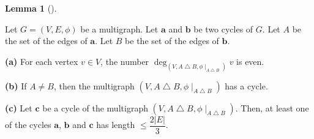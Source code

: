 \documentclass[numbers=enddot,12pt,final,onecolumn,notitlepage]{scrartcl}%
\theoremstyle{definition}
\newtheorem{lem}[theo]{Lemma}
\newenvironment{lemma}[1][]
{\begin{lem}[#1]\begin{leftbar}}
{\end{leftbar}\end{lem}}
\newcommand{\abs}[1]{\left| #1 \right|}
\newcommand{\tup}[1]{\left( #1 \right)}
\begin{document}
\begin{lemma} \label{lem.mt1.cyctree.two-cycles}
Let $G = \tup{V, E, \phi}$ be a multigraph. Let $\mathbf{a}$ and
$\mathbf{b}$ be two cycles of $G$. Let $A$ be the set of the edges
of $\mathbf{a}$. Let $B$ be the set of the edges of $\mathbf{b}$.

\textbf{(a)} For each vertex $v \in V$, the number
$\deg_{\tup{V, A \bigtriangleup B, \phi\mid_{A \bigtriangleup B}}} v$
is even.

\textbf{(b)} If $A \neq B$, then the multigraph
$\tup{V, A \bigtriangleup B, \phi\mid_{A \bigtriangleup B}}$ has a
cycle.

\textbf{(c)} Let $\mathbf{c}$ be a cycle of the multigraph
$\tup{V, A \bigtriangleup B, \phi\mid_{A \bigtriangleup B}}$. Then,
at least one of the cycles $\mathbf{a}$, $\mathbf{b}$ and
$\mathbf{c}$ has length $\leq \dfrac{2 \abs{E}}{3}$.
\end{lemma}
\end{document}
